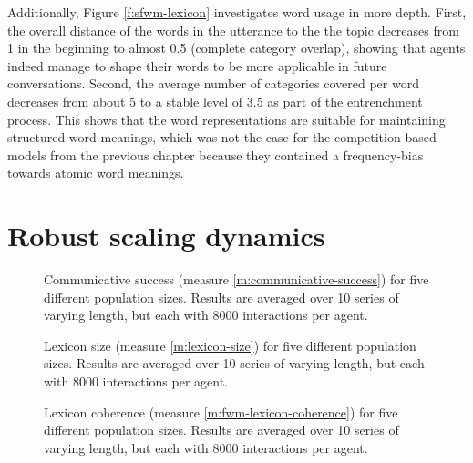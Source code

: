 Additionally, Figure \ref{f:sfwm-lexicon} investigates word usage in
more depth. First, the overall distance of the words in the utterance
to the the topic decreases from 1 in the beginning to almost 0.5
(complete category overlap), showing that agents indeed manage to
shape their words to be more applicable in future
conversations. Second, the average number of categories covered per
word decreases from about 5 to a stable level of 3.5 as part of the
entrenchment process. This shows that the word representations are
suitable for maintaining structured word meanings, which was not the
case for the competition based models from the previous chapter
because they contained a frequency-bias towards atomic word meanings.



\section{Robust scaling dynamics}

\startfiguregroup

\begin{figure}[p]
  \caption{Communi\-cative success (measure
    \ref{m:communicative-success}) for five different population
    sizes. Results are averaged over 10 series of varying length, but
    each with 8000 interactions per agent.}
  \label{f:sfwm-communicative-success-vs-population-size}
\end{figure}

\begin{figure}[p]
  \caption{Lexicon size (measure \ref{m:lexicon-size}) for five
    different population sizes. Results are averaged over 10 series of
    varying length, but each with 8000 interactions per agent.}
  \label{f:sfwm-lexicon-size-vs-population-size}
\end{figure}

\begin{figure}[p]
  \caption{Lexicon coherence (measure \ref{m:fwm-lexicon-coherence})
    for five different population sizes. Results are averaged over 10
    series of varying length, but each with 8000 interactions per
    agent.}
  \label{f:sfwm-lexicon-coherence-vs-population-size}
\end{figure}


\stopfiguregroup

